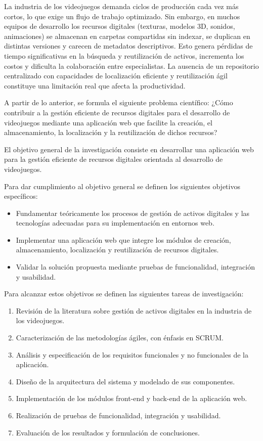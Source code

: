 \introduction

La industria de los videojuegos demanda ciclos de producción cada vez más cortos, lo que exige un flujo de trabajo optimizado. Sin embargo, en muchos equipos de desarrollo los recursos digitales (texturas, modelos 3D, sonidos, animaciones) se almacenan en carpetas compartidas sin indexar, se duplican en distintas versiones y carecen de metadatos descriptivos. Esto genera pérdidas de tiempo significativas en la búsqueda y reutilización de activos, incrementa los costos y dificulta la colaboración entre especialistas. La ausencia de un repositorio centralizado con capacidades de localización eficiente y reutilización ágil constituye una limitación real que afecta la productividad.

A partir de lo anterior, se formula el siguiente problema científico: ¿Cómo contribuir a la gestión eficiente de recursos digitales para el desarrollo de videojuegos mediante una aplicación web que facilite la creación, el almacenamiento, la localización y la reutilización de dichos recursos?

El objetivo general de la investigación consiste en desarrollar una aplicación web para la gestión eficiente de recursos digitales orientada al desarrollo de videojuegos.

Para dar cumplimiento al objetivo general se definen los siguientes objetivos específicos:

\begin{itemize}
    \item Fundamentar teóricamente los procesos de gestión de activos digitales y las tecnologías adecuadas para su implementación en entornos web.
    \item Implementar una aplicación web que integre los módulos de creación, almacenamiento, localización y reutilización de recursos digitales.
    \item Validar la solución propuesta mediante pruebas de funcionalidad, integración y usabilidad.
\end{itemize}

Para alcanzar estos objetivos se definen las siguientes tareas de investigación:

\begin{enumerate}
    \item Revisión de la literatura sobre gestión de activos digitales en la industria de los videojuegos.
    \item Caracterización de las metodologías ágiles, con énfasis en SCRUM.
    \item Análisis y especificación de los requisitos funcionales y no funcionales de la aplicación.
    \item Diseño de la arquitectura del sistema y modelado de sus componentes.
    \item Implementación de los módulos front-end y back-end de la aplicación web.
    \item Realización de pruebas de funcionalidad, integración y usabilidad.
    \item Evaluación de los resultados y formulación de conclusiones.
\end{enumerate}

